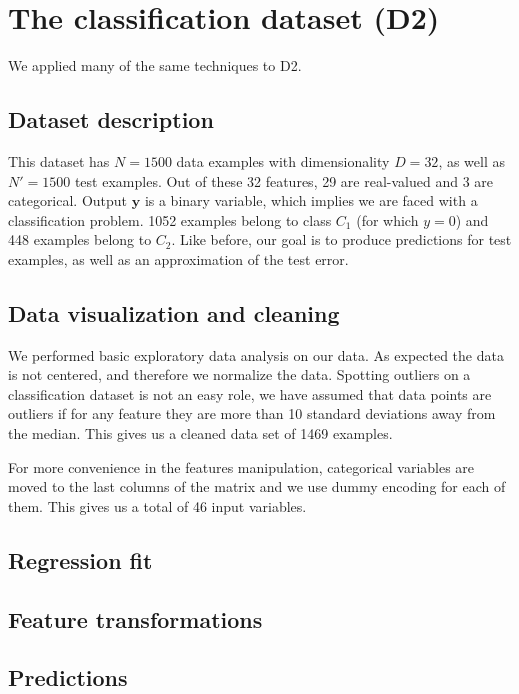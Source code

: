 \documentclass{article} %
\begin{document}
\section{The classification dataset (D2)}
  We applied many of the same techniques to D2.

  \subsection{Dataset description}
  This dataset has $N = 1500$ data examples with dimensionality $D = 32$, as well as $N' = 1500$ test examples. Out of these 32 features, 29 are real-valued and 3 are categorical. Output $\mathbf{y}$ is a binary variable, which implies we are faced with a classification problem. 1052 examples belong to class $C_1$ (for which $y = 0$) and 448 examples belong to $C_2$. Like before, our goal is to produce predictions for test examples, as well as an approximation of the test error.

  \subsection{Data visualization and cleaning}
We performed basic exploratory data analysis on our data. As expected the data is not centered, and therefore we normalize the data. Spotting outliers on a classification dataset is not an easy role, we have assumed that data points are outliers if for any feature they are more than 10 standard deviations away from the median. This gives us a cleaned data set of 1469 examples.

For more convenience in the features manipulation, categorical variables are moved to the last columns of the matrix and we use dummy encoding for each of them. This gives us a total of 46 input variables.

  \subsection{Regression fit}

  \subsection{Feature transformations}

  \subsection{Predictions}
\end{document}
